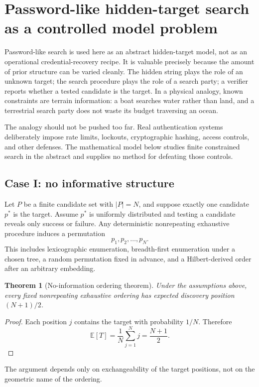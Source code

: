 \documentclass[11pt]{article}
\theoremstyle{hilberttheorem}
\newtheorem{theorem}{Theorem}
\begin{document}
\section{Password-like hidden-target search as a controlled model problem}\label{sec:hidden-target}
Password-like search is used here as an abstract hidden-target model, not as an operational credential-recovery recipe. It is valuable precisely because the amount of prior structure can be varied cleanly. The hidden string plays the role of an unknown target; the search procedure plays the role of a search party; a verifier reports whether a tested candidate is the target. In a physical analogy, known constraints are terrain information: a boat searches water rather than land, and a terrestrial search party does not waste its budget traversing an ocean.

The analogy should not be pushed too far. Real authentication systems deliberately impose rate limits, lockouts, cryptographic hashing, access controls, and other defenses. The mathematical model below studies finite constrained search in the abstract and supplies no method for defeating those controls.

\subsection{Case I: no informative structure}\label{subsec:no-information}
Let $P$ be a finite candidate set with $|P|=N$, and suppose exactly one candidate $p^*$ is the target. Assume $p^*$ is uniformly distributed and testing a candidate reveals only success or failure. Any deterministic nonrepeating exhaustive procedure induces a permutation
\[
p_1,p_2,\ldots,p_N.
\]
This includes lexicographic enumeration, breadth-first enumeration under a chosen tree, a random permutation fixed in advance, and a Hilbert-derived order after an arbitrary embedding.

\begin{theorem}[No-information ordering theorem]
Under the assumptions above, every fixed nonrepeating exhaustive ordering has expected discovery position $(N+1)/2$.
\end{theorem}
\begin{proof}
Each position $j$ contains the target with probability $1/N$. Therefore
\[
\mathbb E[T]=\frac1N\sum_{j=1}^{N}j=\frac{N+1}{2}.
\]
\end{proof}
The argument depends only on exchangeability of the target positions, not on the geometric name of the ordering.
\end{document}
